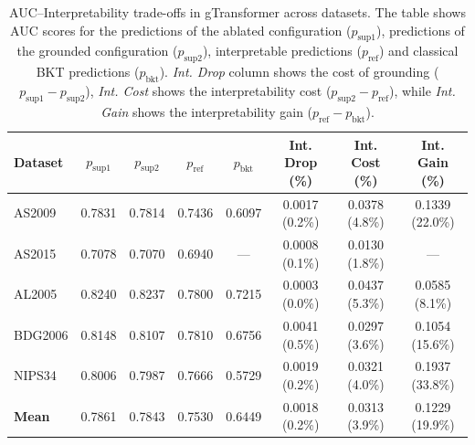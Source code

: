 \documentclass[applsci,article,submit,moreauthors,pdftex]{Definitions/mdpi}
\begin{document}
\begin{table}[htbp]
\centering
\small
\begin{tabular}{lccccccc}
\toprule
\textbf{Dataset} & $p_{\text{sup}1}$ & $p_{\text{sup}2}$ & $p_{\text{ref}}$ & $p_{\text{bkt}}$ & \textbf{Int. Drop (\%)} & \textbf{Int. Cost (\%)} & \textbf{Int. Gain (\%)} \\
\midrule
AS2009 & 0.7831 & 0.7814 & 0.7436 & 0.6097 & 0.0017 (0.2\%) & 0.0378 (4.8\%) & 0.1339 (22.0\%) \\
AS2015 & 0.7078 & 0.7070 & 0.6940 & --- & 0.0008 (0.1\%) & 0.0130 (1.8\%) & --- \\
AL2005 & 0.8240 & 0.8237 & 0.7800 & 0.7215 & 0.0003 (0.0\%) & 0.0437 (5.3\%) & 0.0585 (8.1\%) \\
BDG2006 & 0.8148 & 0.8107 & 0.7810 & 0.6756 & 0.0041 (0.5\%) & 0.0297 (3.6\%) & 0.1054 (15.6\%) \\
NIPS34 & 0.8006 & 0.7987 & 0.7666 & 0.5729 & 0.0019 (0.2\%) & 0.0321 (4.0\%) & 0.1937 (33.8\%) \\
\midrule
\textbf{Mean} & 0.7861 & 0.7843 & 0.7530 & 0.6449 & 0.0018 (0.2\%) & 0.0313 (3.9\%) & 0.1229 (19.9\%) \\
\bottomrule
\end{tabular}
\caption{AUC--Interpretability trade-offs in gTransformer across datasets. The table shows AUC scores for the predictions of the ablated configuration ($p_{\text{sup}1}$), predictions of the grounded configuration ($p_{\text{sup}2}$), interpretable predictions ($p_{\text{ref}}$) and classical BKT predictions ($p_{\text{bkt}}$). \textit{Int. Drop} column shows the cost of grounding ($p_{\text{sup}1} - p_{\text{sup}2}$), \textit{Int. Cost} shows the interpretability cost ($p_{\text{sup}2} - p_{\text{ref}}$), while \textit{Int. Gain} shows the interpretability gain ($p_{\text{ref}} - p_{\text{bkt}}$).}
\label{tab:tradeoff}
\end{table}
\end{document}
